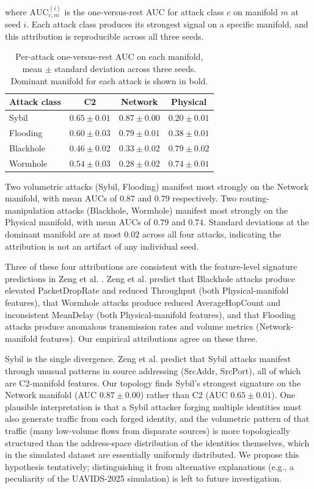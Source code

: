 \documentclass[conf]{new-aiaa}
\begin{document}
where $\text{AUC}_{c, m}^{(i)}$ is the one-versus-rest AUC for attack class $c$ on manifold $m$ at seed $i$. Each attack class produces its strongest signal on a specific manifold, and this attribution is reproducible across all three seeds.

\begin{table}[h]
\centering
\caption{Per-attack one-versus-rest AUC on each manifold, mean $\pm$ standard deviation across three seeds. Dominant manifold for each attack is shown in bold.}
\label{tab:per_attack_auc}
\begin{tabular}{lccc}
\hline
Attack class & C2 & Network & Physical \\
\hline
Sybil & $0.65 \pm 0.01$ & $\mathbf{0.87 \pm 0.00}$ & $0.20 \pm 0.01$ \\
Flooding & $0.60 \pm 0.03$ & $\mathbf{0.79 \pm 0.01}$ & $0.38 \pm 0.01$ \\
Blackhole & $0.46 \pm 0.02$ & $0.33 \pm 0.02$ & $\mathbf{0.79 \pm 0.02}$ \\
Wormhole & $0.54 \pm 0.03$ & $0.28 \pm 0.02$ & $\mathbf{0.74 \pm 0.01}$ \\
\hline
\end{tabular}
\end{table}

Two volumetric attacks (Sybil, Flooding) manifest most strongly on the Network manifold, with mean AUCs of $0.87$ and $0.79$ respectively. Two routing-manipulation attacks (Blackhole, Wormhole) manifest most strongly on the Physical manifold, with mean AUCs of $0.79$ and $0.74$. Standard deviations at the dominant manifold are at most $0.02$ across all four attacks, indicating the attribution is not an artifact of any individual seed.

Three of these four attributions are consistent with the feature-level signature predictions in Zeng et al. \cite{Zeng}. Zeng et al. predict that Blackhole attacks produce elevated PacketDropRate and reduced Throughput (both Physical-manifold features), that Wormhole attacks produce reduced AverageHopCount and inconsistent MeanDelay (both Physical-manifold features), and that Flooding attacks produce anomalous transmission rates and volume metrics (Network-manifold features). Our empirical attributions agree on these three.

Sybil is the single divergence. Zeng et al. predict that Sybil attacks manifest through unusual patterns in source addressing (SrcAddr, SrcPort), all of which are C2-manifold features. Our topology finds Sybil's strongest signature on the Network manifold (AUC $0.87 \pm 0.00$) rather than C2 (AUC $0.65 \pm 0.01$). One plausible interpretation is that a Sybil attacker forging multiple identities must also generate traffic from each forged identity, and the volumetric pattern of that traffic (many low-volume flows from disparate sources) is more topologically structured than the address-space distribution of the identities themselves, which in the simulated dataset are essentially uniformly distributed. We propose this hypothesis tentatively; distinguishing it from alternative explanations (e.g., a peculiarity of the UAVIDS-2025 simulation) is left to future investigation.
\end{document}
